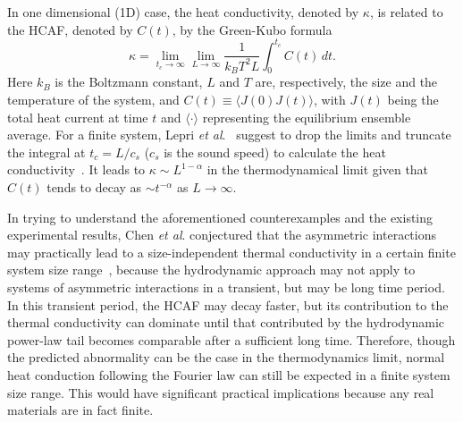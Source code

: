 \documentclass[twocolumn,secnumarabic,amssymb, nobibnotes, aps, pre,superscriptaddress]{revtex4}
\begin{document}
In one dimensional (1D) case, the heat conductivity, denoted by $\kappa$, is related to the HCAF, denoted by $C(t)$, by the Green-Kubo formula
\begin{equation}
\kappa=\lim_{t_c\to\infty}\lim_{L\to\infty}\frac{1}{k_BT^2L}\int_0^{t_c} C(t)\,dt.
\end{equation}
Here $k_B$ is the Boltzmann constant, $L$ and $T$ are, respectively, the size and the temperature of the system,
and $C(t)\equiv \langle J(0)J(t)\rangle$, with $J(t)$ being the total heat current at time $t$ and $\langle \cdot \rangle$ representing the equilibrium ensemble average. For a finite system, Lepri {\it et al}.~\cite{lepri} suggest to drop the limits and truncate the integral at $t_c=L/c_s$ ($c_s$ is the sound speed) to calculate the heat conductivity~\cite{lepri,chen1}. It leads to $\kappa\sim L^{1-\alpha}$ in the thermodynamical limit
given that $C(t)$ tends to decay as $\sim t^{-\alpha}$ as $L\to \infty$.

In trying to understand the aforementioned counterexamples and the existing experimental results, Chen {\it et al}. conjectured that the asymmetric interactions may practically lead to a size-independent thermal conductivity in a certain finite system size range~\cite{chen1}, because the hydrodynamic approach may not apply to systems of asymmetric interactions in a transient, but may be long time period. In this transient period, the HCAF may decay faster, but its contribution to the thermal conductivity can dominate until that contributed by the hydrodynamic power-law tail becomes comparable after a sufficient long time. Therefore, though the predicted abnormality can be the case in the thermodynamics limit, normal heat conduction following the Fourier law can still be expected in a finite system size range. This would have significant practical implications because any real materials are in fact finite.
\end{document}
